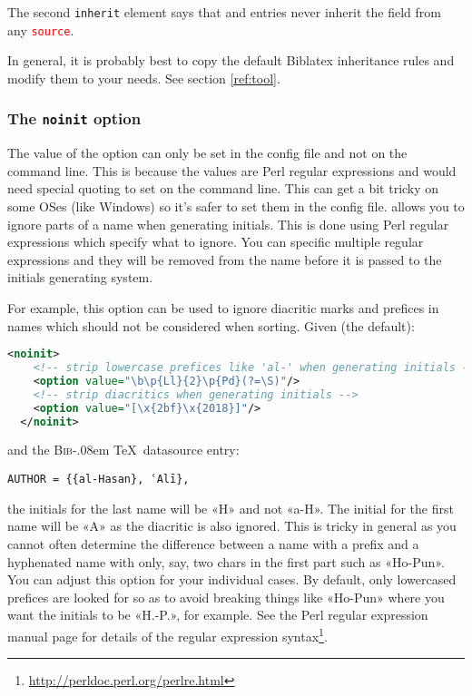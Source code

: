 \documentclass{ltxdockit}
\def\BibTeX{\textsc{Bib}\kern-.08em \TeX}
\newcommand*{\biblatex}{Biblatex\xspace}
\begin{document}
The second \texttt{inherit} element says that  and
 entries never inherit the 
field from any \textcolor{red}{\texttt{source}}.

In general, it is probably best to copy the default \biblatex inheritance
rules and modify them to your needs. See section \ref{ref:tool}.
\bigskip
\subsubsection{The \texttt{noinit} option}\label{noinit}

The value of the  option can only be set in the config file and
not on the command line. This is because the values are Perl regular
expressions and would need special quoting to set on the command line. This
can get a bit tricky on some OSes (like Windows) so it's safer to set them
in the config file.  allows you to ignore parts of a name when
generating initials. This is done using Perl regular expressions which
specify what to ignore. You can specific multiple regular expressions and
they will be removed from the name before it is passed to the initials
generating system.

For example, this option can be used to ignore diacritic marks and prefices
in names which should not be considered when sorting. Given (the default):

\begin{lstlisting}[language=xml]
  <noinit>
    <!-- strip lowercase prefices like 'al-' when generating initials -->
    <option value="\b\p{Ll}{2}\p{Pd}(?=\S)"/>
    <!-- strip diacritics when generating initials -->
    <option value="[\x{2bf}\x{2018}]"/>
  </noinit>
\end{lstlisting}

\noindent and the \BibTeX\ datasource entry:

\begin{verbatim}
AUTHOR = {{al-Hasan}, ʿAlī},
\end{verbatim}

\noindent the initials for the last name will be «H» and not «a-H». The
initial for the first name will be «A» as the diacritic is also ignored.
This is tricky in general as you cannot often determine the difference
between a name with a prefix and a hyphenated name with only, say, two
chars in the first part such as «Ho-Pun». You can adjust this option for
your individual cases. By default, only lowercased prefices are looked for
so as to avoid breaking things like «Ho-Pun» where you want the initials to
be «H.-P.», for example. See the Perl regular expression manual page for
details of the regular expression
syntax\footnote{\url{http://perldoc.perl.org/perlre.html}}.
\end{document}
